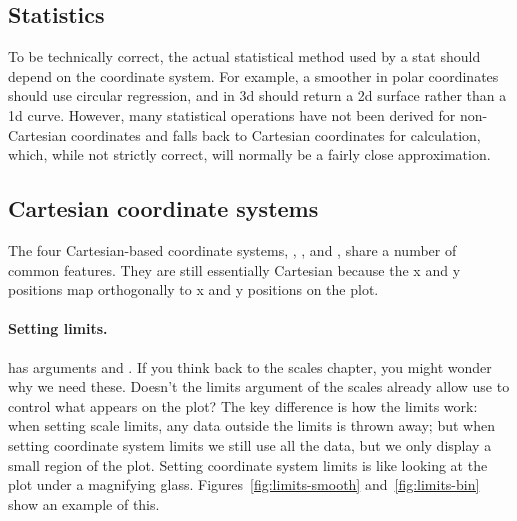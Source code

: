 \subsection{Statistics}
\label{sub:statistics}

To be technically correct, the actual statistical method used by a stat should depend on the coordinate system.  For example, a smoother in polar coordinates should use circular regression, and in 3d should return a 2d surface rather than a 1d curve.  However, many statistical operations have not been derived for non-Cartesian coordinates and \ggplot falls back to Cartesian coordinates for calculation, which, while not strictly correct, will normally be a fairly close approximation.

\subsection{Cartesian coordinate systems}
\label{sub:cartesian}

The four Cartesian-based coordinate systems, , ,  and , share a number of common features.  They are still essentially Cartesian because the x and y positions map orthogonally to x and y positions on the plot.  

\paragraph{Setting limits.}   has arguments  and .  If you think back to the scales chapter, you might wonder why we need these.  Doesn't the limits argument of the scales already allow use to control what appears on the plot?  The key difference is how the limits work: when setting scale limits, any data outside the limits is thrown away; but when setting coordinate system limits we still use all the data, but we only display a small region of the plot.  Setting coordinate system limits is like looking at the plot under a magnifying glass.  Figures~\ref{fig:limits-smooth} and~\ref{fig:limits-bin} show an example of this.

% 


